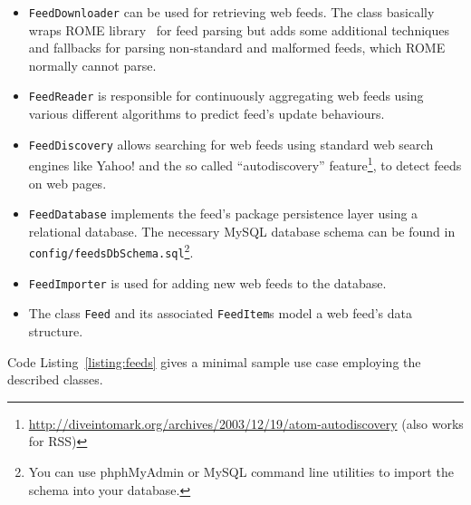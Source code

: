 \begin{itemize}

	\item \texttt{FeedDownloader} can be used for retrieving web feeds. The class basically wraps ROME library~\cite{rome} for feed parsing but adds some additional techniques and fallbacks for parsing non-standard and malformed feeds, which ROME normally cannot parse.

	\item \texttt{FeedReader} is responsible for continuously aggregating web feeds using various different algorithms to predict feed's update behaviours.

	\item \texttt{FeedDiscovery} allows searching for web feeds using standard web search engines like Yahoo! and the so called ``autodiscovery'' feature\footnote{\url{http://diveintomark.org/archives/2003/12/19/atom-autodiscovery} (also works for RSS)}, to detect feeds on web pages.

	\item \texttt{FeedDatabase} implements the feed's package persistence layer using a relational database. The necessary MySQL database schema can be found in \texttt{config/feedsDbSchema.sql}\footnote{You can use phphMyAdmin or MySQL command line utilities to import the schema into your database.}.

	\item \texttt{FeedImporter} is used for adding new web feeds to the database.

	\item The class \texttt{Feed} and its associated \texttt{FeedItem}s model a web feed's data structure.

\end{itemize}

Code Listing~\ref{listing:feeds} gives a minimal sample use case employing the described classes.

